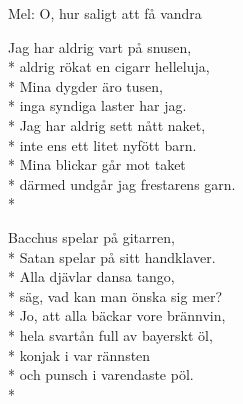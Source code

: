 \begin{SongText}
    \begin{SongInfo}
        Mel: O, hur saligt att få vandra
    \end{SongInfo}
    \begin{SongVerse}
        Jag har aldrig vart på snusen,\\*%
        aldrig rökat en cigarr helleluja,\\*%
        Mina dygder äro tusen,\\*%
        inga syndiga laster har jag.\\*%
        Jag har aldrig sett nått naket,\\*%
        inte ens ett litet nyfött barn.\\*%
        Mina blickar går mot taket\\*%
        därmed undgår jag frestarens garn.\\*%
    \end{SongVerse}
    \begin{SongVerse}
        Bacchus spelar på gitarren,\\*%
        Satan spelar på sitt handklaver.\\*%
        Alla djävlar dansa tango,\\*%
        säg, vad kan man önska sig mer?\\*%
        Jo, att alla bäckar vore brännvin,\\*%
        hela svartån full av bayerskt öl,\\*%
        konjak i var rännsten\\*%
        och punsch i varendaste pöl.\\*%
    \end{SongVerse}
\end{SongText}
